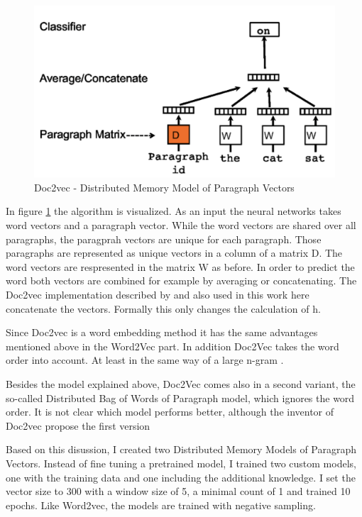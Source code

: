 \documentclass[12pt, a4paper, titlepage]{article}
\begin{document}
\begin{figure}[]
  \center
  \includegraphics[scale=0.5]{doc2vec.png}
  \caption{\label{fig: F2} Doc2vec - Distributed Memory Model of Paragraph Vectors \citep[3]{le2014}}
\end{figure}

In figure \ref{fig: F2} the algorithm is visualized. As an input the neural networks takes word vectors and a paragraph vector. While the word vectors are shared over all paragraphs, the paragprah vectors are unique for each paragraph. Those paragraphs are represented as unique vectors in a column of a matrix D. The word vectors are respresented in the matrix W as before. In order to predict the word both vectors are combined for example by averaging or concatenating. The Doc2vec implementation described by \citet{le2014} and also used in this work here concatenate the vectors. Formally this only changes the calculation of h. \citep{lau2016}

Since Doc2vec is a word embedding method it has the same advantages mentioned above in the Word2Vec part. In addition Doc2Vec takes the word order into account. At least in the same way of a large n-gram \citep{le2014}. 

Besides the model explained above, Doc2Vec comes also in a second variant, the so-called Distributed Bag of Words of Paragraph model, which ignores the word order. It is not clear which model performs better, although the inventor of Doc2vec propose the first version \citep{lau2016}

Based on this disussion, I created two Distributed Memory Models of Paragraph Vectors. Instead of fine tuning a pretrained model, I trained two custom models, one with the training data and one including the additional knowledge. I set the vector size to 300 with a window size of 5, a minimal count of 1 and trained 10 epochs. Like Word2vec, the models are trained with negative sampling.  
\end{document}

